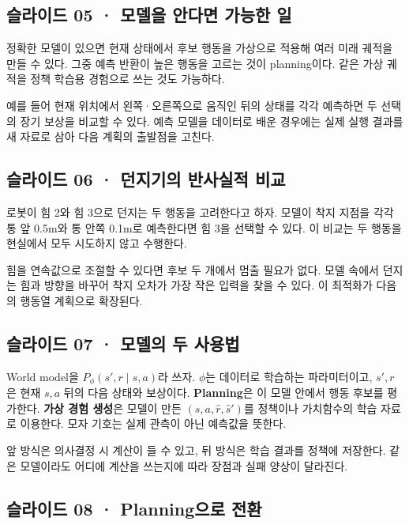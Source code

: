 \documentclass[11pt,a4paper]{article}
\begin{document}
\subsection{슬라이드 05 · 모델을 안다면 가능한 일}

정확한 모델이 있으면 현재 상태에서 후보 행동을 가상으로 적용해 여러 미래 궤적을 만들 수 있다. 그중 예측 반환이 높은 행동을 고르는 것이 planning이다. 같은 가상 궤적을 정책 학습용 경험으로 쓰는 것도 가능하다.\par

예를 들어 현재 위치에서 왼쪽·오른쪽으로 움직인 뒤의 상태를 각각 예측하면 두 선택의 장기 보상을 비교할 수 있다. 예측 모델을 데이터로 배운 경우에는 실제 실행 결과를 새 자료로 삼아 다음 계획의 출발점을 고친다.\par

\subsection{슬라이드 06 · 던지기의 반사실적 비교}

로봇이 힘 2와 힘 3으로 던지는 두 행동을 고려한다고 하자. 모델이 착지 지점을 각각 통 앞 0.5m와 통 안쪽 0.1m로 예측한다면 힘 3을 선택할 수 있다. 이 비교는 두 행동을 현실에서 모두 시도하지 않고 수행한다.\par

힘을 연속값으로 조절할 수 있다면 후보 두 개에서 멈출 필요가 없다. 모델 속에서 던지는 힘과 방향을 바꾸어 착지 오차가 가장 작은 입력을 찾을 수 있다. 이 최적화가 다음의 행동열 계획으로 확장된다.\par

\subsection{슬라이드 07 · 모델의 두 사용법}

World model을 $P_\phi(s',r\mid s,a)$라 쓰자. $\phi$는 데이터로 학습하는 파라미터이고, $s',r$은 현재 $s,a$ 뒤의 다음 상태와 보상이다. \textbf{Planning}은 이 모델 안에서 행동 후보를 평가한다. \textbf{가상 경험 생성}은 모델이 만든 $(s,a,\hat r,\hat s')$를 정책이나 가치함수의 학습 자료로 이용한다. 모자 기호는 실제 관측이 아닌 예측값을 뜻한다.\par

앞 방식은 의사결정 시 계산이 들 수 있고, 뒤 방식은 학습 결과를 정책에 저장한다. 같은 모델이라도 어디에 계산을 쓰는지에 따라 장점과 실패 양상이 달라진다.\par

\subsection{슬라이드 08 · Planning으로 전환}
\end{document}
